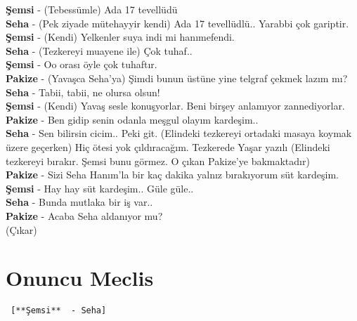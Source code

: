 \documentclass[]{book}
\begin{document}
\textbf{Şemsi} - (Tebessümle) Ada 17 tevellüdü\\
\textbf{Seha} - (Pek ziyade mütehayyir kendi) Ada 17 tevellüdlü.. Yarabbi çok gariptir.\\
\textbf{Şemsi} - (Kendi) Yelkenler suya indi mi hanımefendi.\\
\textbf{Seha} - (Tezkereyi muayene ile) Çok tuhaf..\\
\textbf{Şemsi} - Oo orası öyle çok tuhaftır.\\
\textbf{Pakize} - (Yavaşca Seha'ya) Şimdi bunun üstüne yine telgraf çekmek lazım mı?\\
\textbf{Seha} - Tabii, tabii, ne olursa olsun!\\
\textbf{Şemsi} - (Kendi) Yavaş sesle konuşyorlar. Beni birşey anlamıyor zannediyorlar.\\
\textbf{Pakize} - Ben gidip senin odanla meşgul olayım kardeşim..\\
\textbf{Seha} - Sen bilirsin cicim.. Peki git. (Elindeki tezkereyi ortadaki masaya koymak üzere geçerken) Hiç ötesi yok çıldıracağım. Tezkerede Yaşar yazılı (Elindeki tezkereyi bırakır. Şemsi bunu görmez. O çıkan Pakize'ye bakmaktadır)\\
\textbf{Pakize} - Sizi Seha Hanım'la bir kaç dakika yalnız bırakıyorum süt kardeşim.\\
\textbf{Şemsi} - Hay hay süt kardeşim.. Güle güle..\\
\textbf{Seha} - Bunda mutlaka bir iş var..\\
\textbf{Pakize} - Acaba Seha aldanıyor mu?\\
(Çıkar)\\

\hypertarget{onuncu-meclis}{%
\section{Onuncu Meclis}\label{onuncu-meclis}}

\begin{verbatim}
 [**Şemsi**  - Seha]
\end{verbatim}
\end{document}

